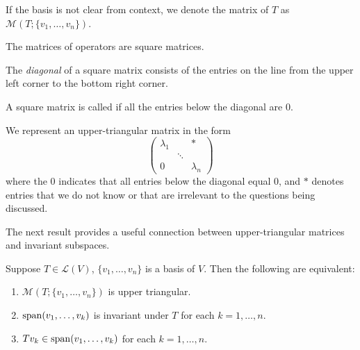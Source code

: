 \begin{notation}
If the basis is not clear from context, we denote the matrix of $T$ as $\mathcal{M}(T;\{v_1,\dots,v_n\})$.
\end{notation}

\begin{remark}
The matrices of operators are square matrices.
\end{remark}

The \emph{diagonal} of a square matrix consists of the entries on the line from the upper left corner to the bottom right corner.

\begin{definition}
A square matrix is called  if all the entries below the diagonal are $0$.
\end{definition}

We represent an upper-triangular matrix in the form
\[\begin{pmatrix}
\lambda_1&&\ast\\
&\ddots&\\
0&&\lambda_n
\end{pmatrix}\]
where the $0$ indicates that
all entries below the diagonal equal $0$, and $\ast$ denotes entries that we do not know or that are irrelevant to the questions being discussed.

The next result provides a useful connection between upper-triangular matrices and invariant subspaces.

\begin{lemma}\label{lemma:upper-triangular-matrix-conditions}
Suppose $T\in\mathcal{L}(V)$, $\{v_1,\dots,v_n\}$ is a basis of $V$. Then the following are equivalent:
\begin{enumerate}[label=(\roman*)]
\item $\mathcal{M}(T;\{v_1,\dots,v_n\})$ is upper triangular.
\item $\operatorname{span}(v_1,\dots,v_k)$ is invariant under $T$ for each $k=1,\dots,n$.
\item $Tv_k\in\operatorname{span}(v_1,\dots,v_k)$ for each $k=1,\dots,n$.
\end{enumerate}
\end{lemma}

